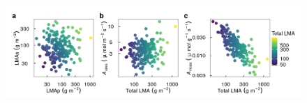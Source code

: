 \documentclass[
  12pt,
  a4paper,
,tablecaptionabove
]{scrartcl}
\providecommand{\DIFaddbeginFL}{} %
\providecommand{\DIFdelbeginFL}{} %
\providecommand{\DIFdelendFL}{} %
\newcommand{\DIFscaledelfig}{0.5}
\newlength{\DIFdelgraphicswidth} %
\newlength{\DIFdelgraphicsheight} %
\newcommand{\DIFaddincludegraphics}[2][]{{\color{blue}\fbox{\DIFOincludegraphics[#1]{#2}}}} %
\newcommand{\DIFdelincludegraphics}[2][]{%
\sbox{\DIFdelgraphicsbox}{\DIFOincludegraphics[#1]{#2}}%
\settoboxwidth{\DIFdelgraphicswidth}{\DIFdelgraphicsbox} %
\settoboxtotalheight{\DIFdelgraphicsheight}{\DIFdelgraphicsbox} %
\scalebox{\DIFscaledelfig}{%
\parbox[b]{\DIFdelgraphicswidth}{\usebox{\DIFdelgraphicsbox}\\[-\baselineskip] \rule{\DIFdelgraphicswidth}{0em}}\llap{\resizebox{\DIFdelgraphicswidth}{\DIFdelgraphicsheight}{%
\setlength{\unitlength}{\DIFdelgraphicswidth}%
\begin{picture}(1,1)%
\thicklines\linethickness{2pt} %
{\color[rgb]{1,0,0}\put(0,0){\framebox(1,1){}}}%
{\color[rgb]{1,0,0}\put(0,0){\line( 1,1){1}}}%
{\color[rgb]{1,0,0}\put(0,1){\line(1,-1){1}}}%
\end{picture}%
}\hspace*{3pt}}} %
} %
\DeclareRobustCommand{\DIFaddbeginFL}{\DIFOaddbeginFL \let\includegraphics\DIFaddincludegraphics} %
\DeclareRobustCommand{\DIFdelbeginFL}{\DIFOdelbeginFL \let\includegraphics\DIFdelincludegraphics} %
\DeclareRobustCommand{\DIFdelendFL}{\DIFOaddendFL \let\includegraphics\DIFOincludegraphics} %
\begin{document}
\begin{figure}
\DIFdelbeginFL %
\DIFdelendFL \DIFaddbeginFL 

{\centering \includegraphics{../figs/hypo.png}

}


\end{figure}
\end{document}
